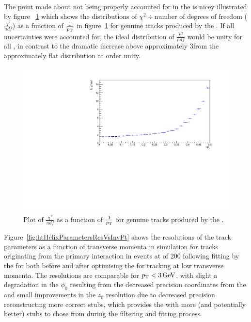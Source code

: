 The point made about \MS not being properly accounted for in the \KF is nicey illustrated by figure ~\ref{fig:2GeVFlatChi2Ndf} which shows the distributions of $\chi^{2} \div \text{number of degrees of freedom}$ ($\frac{\chi^{2}}{ndf}$) as a function of $\frac{1}{p_{\mathrm{T}}}$ in figure~\ref{fig:2GeVFlatChi2Ndf} for genuine tracks produced by the \KF.
If all uncertainties were accounted for, the ideal distribution of $\frac{\chi^{2}}{ndf}$ would be unity for all \pT, in contrast to the dramatic increase above approximately 3\GeV from the approximately flat distribution at order unity.

\begin{figure}[tbp]
\centering
\includegraphics[width=\textwidth]{figs/tk-upgrade/results-lowPtTracking/kfChi2NdfVsInvPtFlatGeometry_5000.pdf}
\caption{Plot of $\frac{\chi^{2}}{ndf}$ as a function of $\frac{1}{p_{\mathrm{T}}}$ for genuine tracks produced by the \KF.}
\label{fig:2GeVFlatChi2Ndf}
\end{figure}

Figure~\ref{fig:htHelixParametersResVsInvPt} shows the resolutions of the track parameters as a function of transverse momenta in simulation for tracks originating from the primary interaction in \ttbar events at \PU of 200 following fitting by the \KF for both before and after optimising the \HT for tracking at low transverse momenta.
The resolutions are comparable for $p_{\mathrm{T}} < 3\,\text{Ge\hspace{-.08em}V}$, with slight a degradation in the $\phi_{0}$ resulting from the decreased precision coordinates from the \HT and small improvements in the $z_{0}$ resolution due to decreased precision \HT reconstructing more correct stubs, which provides the \KF with more (and potentially better) stubs to chose from during the filtering and fitting process.

